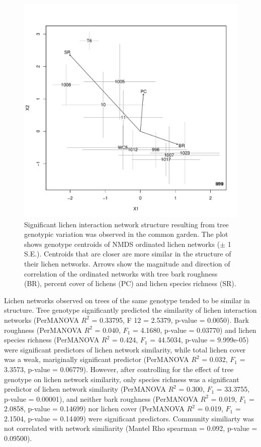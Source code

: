 \documentclass[9pt,twocolumn,twoside,lineno]{pnas-new}
\begin{document}
{\begin{figure}[ht]
\centering
\includegraphics[width=\linewidth]{cn_chplot.pdf}
\caption{Significant lichen interaction network structure resulting
  from tree genotypic variation was observed in the common garden.
  The plot shows genotype centroids of NMDS ordinated lichen networks
  ($\pm$ 1 S.E.). Centroids that are closer are more similar in the
  structure of their lichen networks. Arrows show the magnitude and
  direction of correlation of the ordinated networks with tree bark
  roughness (BR), percent cover of lichens (PC) and lichen species
  richness (SR).}
\label{fig:cn_ch_plot}
\end{figure}


Lichen networks observed on trees of the same genotype tended to be
similar in structure. Tree genotype significantly predicted the
similarity of lichen interaction networks (PerMANOVA $R^2$ = 0.33795,
F 12 = 2.5379, p-value = 0.0050). Bark roughness (PerMANOVA $R^2$ =
0.040, $F_1$ = 4.1680, p-value = 0.03770) and lichen species richness
(PerMANOVA $R^2$ = 0.424, $F_1$ = 44.5034, p-value = 9.999e-05) were
significant predictors of lichen network similarity, while total
lichen cover was a weak, mariginally significant predictor (PerMANOVA
$R^2$ = 0.032, $F_1$ = 3.3573, p-value = 0.06779). However, after
controlling for the effect of tree genotype on lichen network
similarity, only species richness was a significant predictor of
lichen network similarity (PerMANOVA $R^2$ = 0.300, $F_1$ = 33.3755,
p-value = 0.00001), and neither bark roughness (PerMANOVA $R^2$ =
0.019, $F_1$ = 2.0858, p-value = 0.14699) nor lichen cover (PerMANOVA
$R^2$ = 0.019, $F_1$ = 2.1504, p-value = 0.14409) were significant
predictors. Community similiarty was not correlated with network
similiarity (Mantel Rho spearman = 0.092, p-value = 0.09500).



}
\end{document}
